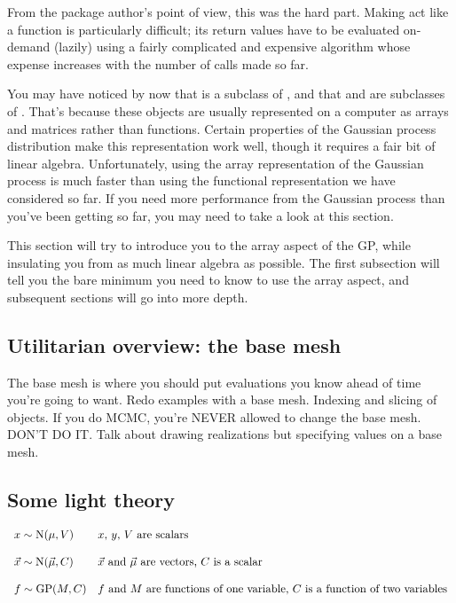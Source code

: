 \documentclass{manual}
\begin{document}
From the package author's point of view, this was the hard part. Making  act like a function is particularly difficult; its return values have to be evaluated on-demand (lazily) using a fairly complicated and expensive algorithm whose expense increases with the number of calls made so far.

You may have noticed by now that  is a subclass of , and that  and  are subclasses of . That's because these objects are usually represented on a computer as arrays and matrices rather than functions. Certain properties of the Gaussian process distribution make this representation work well, though it requires a fair bit of linear algebra. Unfortunately, using the array representation of the Gaussian process is much faster than using the functional representation we have considered so far. If you need more performance from the Gaussian process than you've been getting so far, you may need to take a look at this section.

This section will try to introduce you to the array aspect of the GP, while insulating you from as much linear algebra as possible. The first subsection will tell you the bare minimum you need to know to use the array aspect, and subsequent sections will go into more depth.

\subsection{Utilitarian overview: the base mesh}

The base mesh is where you should put evaluations you know ahead of time you're going to want. Redo examples with a base mesh. Indexing and slicing of objects. If you do MCMC, you're NEVER allowed to change the base mesh. DON'T DO IT. Talk about drawing realizations but specifying values on a base mesh.

\subsection{Some light theory} 

\begin{equation}
    \begin{array}{ll}
        x\sim\textup N(\mu,V) & \textup{$x$, $y$, $V$ are scalars}\\\\
        \vec x\sim\textup N(\vec \mu,C)& \textup{$\vec x$ and $\vec \mu$ are vectors, $C$ is a scalar}\\\\
        f\sim\textup{GP}(M, C) & \textup{$f$ and $M$ are functions of one variable, $C$ is a function of two variables}
    \end{array}
\end{equation}
\end{document}

